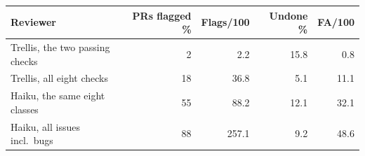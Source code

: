 \begin{tabular}{lrrrr}\toprule
Reviewer & PRs flagged \% & Flags/100 & Undone \% & FA/100 \\\midrule
Trellis, the two passing checks & 2 & 2.2 & 15.8 & 0.8 \\
Trellis, all eight checks & 18 & 36.8 & 5.1 & 11.1 \\
Haiku, the same eight classes & 55 & 88.2 & 12.1 & 32.1 \\
Haiku, all issues incl.\ bugs & 88 & 257.1 & 9.2 & 48.6 \\
\bottomrule\end{tabular}
